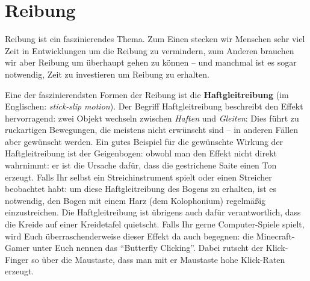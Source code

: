 \section{Reibung}
\label{sec:physik:reibung}

Reibung ist ein faszinierendes Thema. Zum Einen stecken wir Menschen sehr viel Zeit in Entwicklungen um die Reibung zu vermindern, zum Anderen brauchen wir aber Reibung um überhaupt gehen zu können -- und manchmal ist es sogar notwendig, Zeit zu investieren um Reibung zu erhalten.

Eine der faszinierendsten Formen der Reibung ist die \textbf{Haftgleitreibung} (im Englischen: \emph{stick-slip motion}). Der Begriff Haftgleitreibung beschreibt den Effekt hervorragend: zwei Objekt wechseln zwischen \emph{Haften} und \emph{Gleiten}: Dies führt zu ruckartigen Bewegungen, die meistens nicht erwünscht sind -- in anderen Fällen aber gewünscht werden. Ein gutes Beispiel für die gewünschte Wirkung der Haftgleitreibung ist der Geigenbogen: obwohl man den Effekt nicht direkt wahrnimmt: er ist die Ursache dafür, dass die gestrichene Saite einen Ton erzeugt. Falls Ihr selbst ein Streichinstrument spielt oder einen Streicher beobachtet habt: um diese Haftgleitreibung des Bogens zu erhalten, ist es notwendig, den Bogen mit einem Harz (dem Kolophonium) regelmäßig einzustreichen. Die Haftgleitreibung ist übrigens auch dafür verantwortlich, dass die Kreide auf einer Kreidetafel quietscht. Falls Ihr gerne Computer-Spiele spielt, wird Euch überraschenderweise dieser Effekt da auch begegnen: die Minecraft-Gamer unter Euch nennen das ``Butterfly Clicking''. Dabei rutscht der Klick-Finger so über die Maustaste, dass man mit er Maustaste hohe Klick-Raten erzeugt. 

